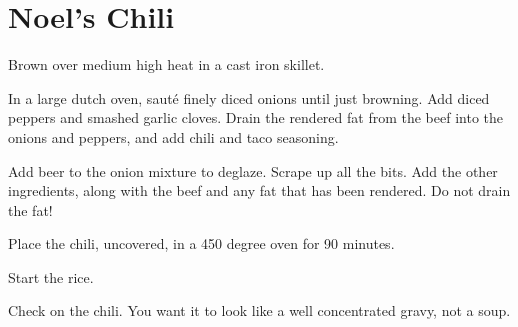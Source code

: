 \section{Noel's Chili}
\begin{recipe}



Brown over medium high heat in a cast iron skillet.


In a large dutch oven, sauté finely diced onions until just browning. Add diced peppers and smashed garlic cloves. Drain the rendered fat from the beef into the onions and peppers, and add chili and taco seasoning.



Add beer to the onion mixture to deglaze. Scrape up all the bits. Add the other ingredients, along with the beef and any fat that has been rendered. Do not drain the fat!

Place the chili, uncovered, in a 450 degree oven for 90 minutes.


Start the rice.

Check on the chili. You want it to look like a well concentrated gravy, not a soup.



\end{recipe}
